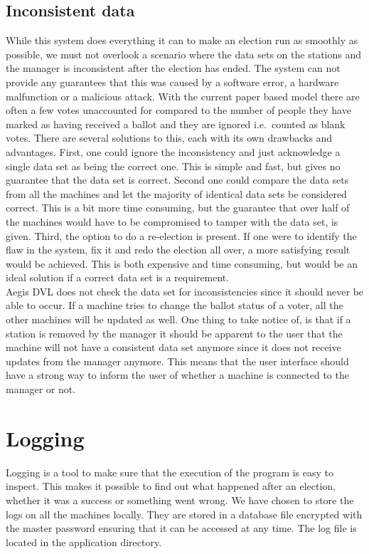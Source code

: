 \documentclass[a4paper]{report}
\begin{document}
\subsection{Inconsistent data}
While this system does everything it can to make an election run as smoothly as possible, we must not overlook a scenario where the data sets on the stations and the manager is inconsistent after the election has ended. The system can not provide any guarantees that this was caused by a software error, a hardware malfunction or a malicious attack. With the current paper based model there are often a few votes unaccounted for compared to the number of people they have marked as having received a ballot and they are ignored i.e.\ counted as blank votes. There are several solutions to this, each with its own drawbacks and advantages. First,  one could ignore the inconsistency and just acknowledge a single data set as being the correct one. This is simple and fast, but gives no guarantee that the data set is correct. Second one could compare the data sets from all the machines and let the majority of identical data sets be considered correct. This is a bit more time consuming, but the guarantee that over half of the machines would have to be compromised to tamper with the data set, is given. Third, the option to do a re-election is present. If one were to identify the flaw in the system, fix it and redo the election all over, a more satisfying result would be achieved. This is both expensive and time consuming, but would be an ideal solution if a correct data set is a requirement. \\

Aegis DVL does not check the data set for inconsistencies since it should never be able to occur. If a machine tries to change the ballot status of a voter, all the other machines will be updated as well. One thing to take notice of, is that if a station is removed by the manager it should be apparent to the user that the machine will not have a consistent data set anymore since it does not receive updates from the manager anymore. This means that the user interface should have a strong way to inform the user of whether a machine is connected to the manager or not.  

\section{Logging}
Logging is a tool to make sure that the execution of the program is easy to inspect. This makes it possible to find out what happened after an election, whether it was a success or something went wrong. We have chosen to store the logs on all the machines locally. They are stored in a database file encrypted with the master password ensuring that it can be accessed at any time. The log file is located in the application directory. \\
\end{document}
